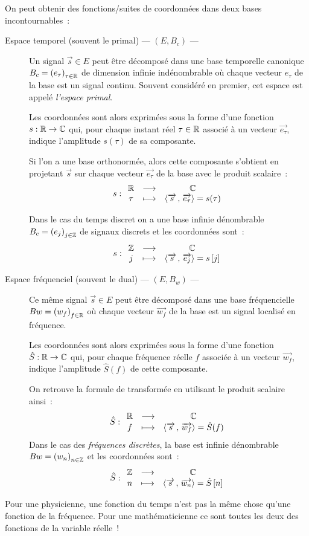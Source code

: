 On peut obtenir des fonctions/suites de coordonnées dans deux bases incontournables~:
\begin{description}
\item[Espace temporel (souvent le primal) --- $\left(E, B_c\right)$
  ---] Un signal $\vec{s}\in E$ peut être décomposé dans une base
  temporelle canonique $B_c=\left(e_\tau\right)_{\tau\in\mathbb{R}}$ de
  dimension infinie indénombrable où chaque vecteur $e_\tau$ de la
  base est un signal continu. Souvent considéré en premier, cet espace
  est appelé \emph{l'espace primal}.

  Les coordonnées sont alors exprimées sous la forme d'une fonction
  $s:\mathbb{R}\to\mathbb{C}$ qui, pour chaque instant réel $\tau\in\mathbb{R}$ associé à un
  vecteur $\vec{e_\tau}$, indique l'amplitude $s(\tau)$ de sa
  composante.

  Si l'on a une base orthonormée, alors cette composante
  s'obtient en projetant $\vec{s}$ sur chaque vecteur $\vec{e_\tau}$
  de la base avec le produit scalaire~:
  $$ s : \begin{array}{ccc} \mathbb{R} & \longrightarrow & \mathbb{C} \\ \tau & \longmapsto & \langle\overrightarrow{s}\,,\,\overrightarrow{e_\tau}\rangle=s(\tau) \\ \end{array}$$

  Dans le cas du temps discret on a une base infinie dénombrable
  $B_c=\left(e_j\right)_{j\in\mathbb{Z}}$ de signaux discrets et les
  coordonnées sont~:
  $$ s : \begin{array}{ccc} \mathbb{Z} & \longrightarrow & \mathbb{C} \\ j & \longmapsto & \langle\overrightarrow{s}\,,\,\overrightarrow{e_j}\rangle=s\left[j\right] \\ \end{array}$$

\item[Espace fréquenciel (souvent le dual) --- $\left(E, B_w\right)$
  ---] Ce même signal $\vec{s}\in E$ peut être décomposé dans une
  base fréquencielle $Bw=\left(w_f\right)_{f\in\mathbb{R}}$ où chaque vecteur
  $\vec{w_f}$ de la base est un signal localisé en fréquence.

  Les coordonnées sont alors exprimées sous la forme d'une fonction
  $\hat{S}:\mathbb{R}\to\mathbb{C}$ qui, pour
  chaque fréquence réelle $f$ associée à un vecteur $\vec{w_f}$,
  indique l'amplitude $\hat{S}(f)$ de cette composante.

  On retrouve la formule de transformée en utilisant le produit
  scalaire ainsi~:
  $$ \hat{S} : \begin{array}{ccc} \mathbb{R} & \longrightarrow & \mathbb{C} \\ f & \longmapsto & \langle\overrightarrow{s}\,,\,\overrightarrow{w_f}\rangle=\hat{S}(f) \\ \end{array}$$
  Dans le cas des \emph{fréquences discrètes}, la base est infinie
  dénombrable $Bw=\left(w_n\right)_{n\in\mathbb{Z}}$ et les coordonnées sont~:
  $$ \hat{S} : \begin{array}{ccc} \mathbb{Z} & \longrightarrow & \mathbb{C} \\ n & \longmapsto & \langle\overrightarrow{s}\,,\,\overrightarrow{w_n}\rangle=\hat{S}\left[n\right] \\ \end{array}$$
  
\end{description}
Pour une physicienne, une fonction du temps n'est pas la même chose
qu'une fonction de la fréquence. Pour une mathématicienne ce sont
toutes les deux des fonctions de la variable réelle~!

